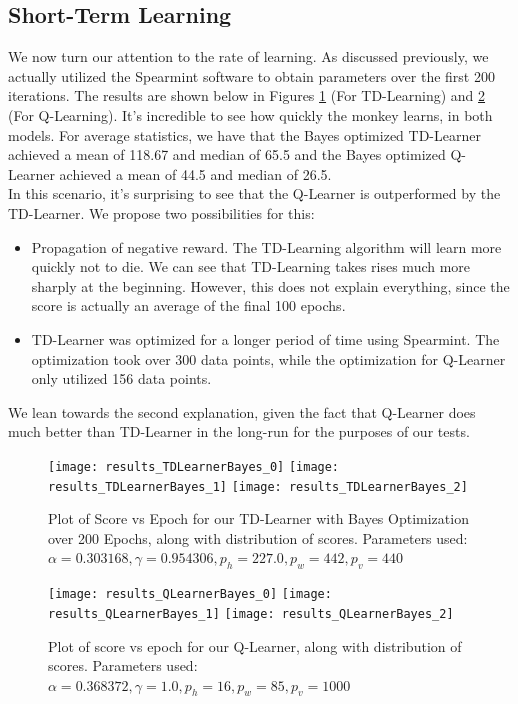 \documentclass[letterpaper]{article}
\begin{document}
\subsection{Short-Term Learning}
We now turn our attention to the rate of learning. As discussed previously, we actually utilized the Spearmint software to obtain parameters over the first 200 iterations. The results are shown below in Figures \ref{fig:tdscore_small} (For TD-Learning) and \ref{fig:qscore_small} (For Q-Learning). It's incredible to see how quickly the monkey learns, in both models. For average statistics, we have that the Bayes optimized TD-Learner achieved a mean of 118.67 and median of 65.5 and the Bayes optimized Q-Learner achieved a mean of 44.5 and median of 26.5. \\

In this scenario, it's surprising to see that the Q-Learner is outperformed by the TD-Learner. We propose two possibilities for this:
\begin{itemize}
\item Propagation of negative reward. The TD-Learning algorithm will learn more quickly not to die. We can see that TD-Learning takes rises much more sharply at the beginning. However, this does not explain everything, since the score is actually an average of the final 100 epochs.
\item TD-Learner was optimized for a longer period of time using Spearmint. The optimization took over 300 data points, while the optimization for Q-Learner only utilized 156 data points. 
\end{itemize}
We lean towards the second explanation, given the fact that Q-Learner does much better than TD-Learner in the long-run for the purposes of our tests. 


\begin{figure}
\centering
\texttt{[image: results\_TDLearnerBayes\_0]}
\texttt{[image: results\_TDLearnerBayes\_1]}
\texttt{[image: results\_TDLearnerBayes\_2]}
\caption{Plot of Score vs Epoch for our TD-Learner with Bayes Optimization over 200 Epochs, along with distribution of scores. Parameters used: $\alpha = 0.303168, \gamma = 0.954306, p_h = 227.0, p_w = 442,p_v = 440$}
\label{fig:tdscore_small}
\end{figure}


\begin{figure}
\centering
\texttt{[image: results\_QLearnerBayes\_0]}
\texttt{[image: results\_QLearnerBayes\_1]}
\texttt{[image: results\_QLearnerBayes\_2]}
\caption{Plot of score vs epoch for our Q-Learner, along with distribution of scores. Parameters used: $\alpha = 0.368372, \gamma = 1.0, p_h = 16, p_w = 85,p_v = 1000$}
\label{fig:qscore_small}
\end{figure}
\end{document}
